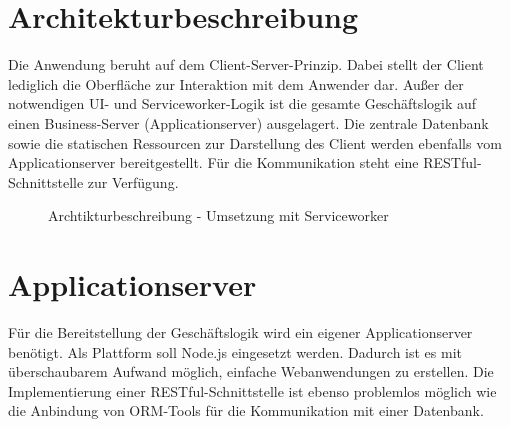 \newpage
\section{Architekturbeschreibung}
\label{sec_konzeption_serviceworker_architektur}

Die Anwendung beruht auf dem Client-Server-Prinzip. Dabei stellt der Client lediglich die Oberfläche zur Interaktion mit dem Anwender dar. Außer der notwendigen UI- und Serviceworker-Logik ist die gesamte Geschäftslogik auf einen Business-Server (Applicationserver) ausgelagert. Die zentrale Datenbank sowie die statischen Ressourcen zur Darstellung des Client werden ebenfalls vom Applicationserver bereitgestellt. Für die Kommunikation steht eine RESTful-Schnittstelle zur Verfügung.

\begin{figure}[htp] 
\caption{Archtikturbeschreibung - Umsetzung mit Serviceworker}
\label{image_architektur-serviceworker-push}
\end{figure} 

\newpage
\section{Applicationserver}
\label{sec_konzeption_applicationserver}

Für die Bereitstellung der Geschäftslogik wird ein eigener Applicationserver benötigt. Als Plattform soll Node.js eingesetzt werden. Dadurch ist es mit überschaubarem Aufwand möglich, einfache Webanwendungen zu erstellen. Die Implementierung einer RESTful-Schnittstelle ist ebenso problemlos möglich wie die Anbindung von ORM-Tools für die Kommunikation mit einer Datenbank. 

